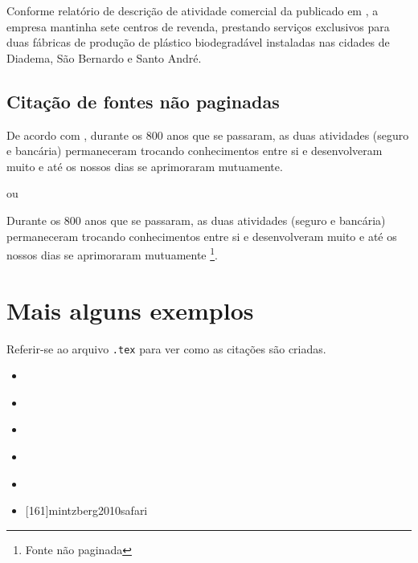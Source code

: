 Conforme relatório de descrição de atividade comercial da  \citeauthor{biolife2008}
publicado em , a empresa mantinha sete centros de revenda,
prestando serviços exclusivos para duas fábricas de produção de plástico biodegradável
instaladas nas cidades de Diadema, São Bernardo e Santo André.

\subsection{Citação de fontes não paginadas}

De acordo com \textcite[cap. 1]{cnseg2017mercado}, durante os 800 anos que se passaram,
as duas atividades (seguro e bancária) permaneceram trocando conhecimentos entre si e
desenvolveram muito e até os nossos dias se aprimoraram mutuamente.

ou

Durante os 800 anos que se passaram, as duas atividades (seguro e bancária) permaneceram
trocando conhecimentos entre si e desenvolveram muito e até os nossos dias se aprimoraram
mutuamente \parencite[cap. 1]{cnseg2017mercado}\footnote{Fonte não paginada}.

\section{Mais alguns exemplos}

Referir-se ao arquivo \texttt{.tex} para ver como as citações são criadas.

\begin{itemize}
  \item \cite[ver:][30--42]{churchill2012marketing}
  \item \textcites[142-146]{churchill2012marketing}[21--23]{biolife2008}[45]{simon1997administrative}
  \item \cites[142-146]{churchill2012marketing}[21--23]{biolife2008}[45]{simon1997administrative}
  \item \cite{nouri2025}
  \item \cite{marginalrevolutionBordaCount}
  \item {}[161]{mintzberg2010safari}
\end{itemize}